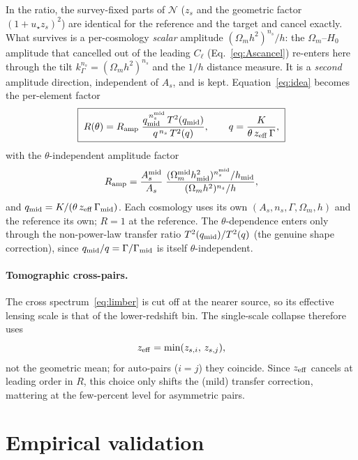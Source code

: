 \documentclass[11pt]{article}
\newcommand{\Om}{\Omega_m}
\newcommand{\As}{A_s}
\newcommand{\ns}{n_s}
\begin{document}
In the ratio, the survey-fixed parts of $\mathcal{N}$ ($z_s$ and the
geometric factor $(1+u_\star z_s)^2$) are identical for the reference
and the target and cancel exactly. What survives is a per-cosmology
\emph{scalar} amplitude $(\Om h^2)^{\ns}/h$: the $\Om$--$H_0$
amplitude that cancelled out of the leading $C_\ell$
(Eq.~\ref{eq:Ascancel}) re-enters here through the tilt
$k_\Gamma^{\ns}=(\Om h^2)^{\ns}$ and the $1/h$ distance measure. It
is a \emph{second} amplitude direction, independent of $A_s$, and is
kept. Equation~\eqref{eq:idea} becomes the per-element factor
\begin{equation}
  \boxed{\;
  R(\theta)=R_{\rm amp}\;
  \frac{q_{\rm mid}^{\,\ns^{\rm mid}}\,T^2(q_{\rm mid})}
       {q^{\,\ns}\,T^2(q)},
  \qquad
  q=\frac{K}{\theta\,z_{\rm eff}\,\Gamma},
  \;}
  \label{eq:R}
\end{equation}
with the $\theta$-independent amplitude factor
\begin{equation}
  R_{\rm amp}=\frac{\As^{\rm mid}}{\As}\;
  \frac{(\Om^{\rm mid}h_{\rm mid}^2)^{\ns^{\rm mid}}/h_{\rm mid}}
       {(\Om h^2)^{\ns}/h},
  \label{eq:Ramp}
\end{equation}
and $q_{\rm mid}=K/(\theta\,z_{\rm eff}\,\Gamma_{\rm mid})$. Each
cosmology uses its own $(\As,\ns,\Gamma,\Om,h)$ and the reference its
own; $R=1$ at the reference. The $\theta$-dependence enters only
through the non-power-law transfer ratio $T^2(q_{\rm mid})/T^2(q)$
(the genuine shape correction), since
$q_{\rm mid}/q=\Gamma/\Gamma_{\rm mid}$ is itself
$\theta$-independent.

\paragraph{Tomographic cross-pairs.}
The cross spectrum~\eqref{eq:limber} is cut off at the nearer
source, so its effective lensing scale is that of the lower-redshift
bin. The single-scale collapse therefore uses
\begin{equation}
  z_{\rm eff}=\min(z_{s,i},\,z_{s,j}),
  \label{eq:zeff}
\end{equation}
not the geometric mean; for auto-pairs ($i=j$) they coincide. Since
$z_{\rm eff}$ cancels at leading order in $R$, this choice only
shifts the (mild) transfer correction, mattering at the few-percent
level for asymmetric pairs.

\section{Empirical validation}
\end{document}
